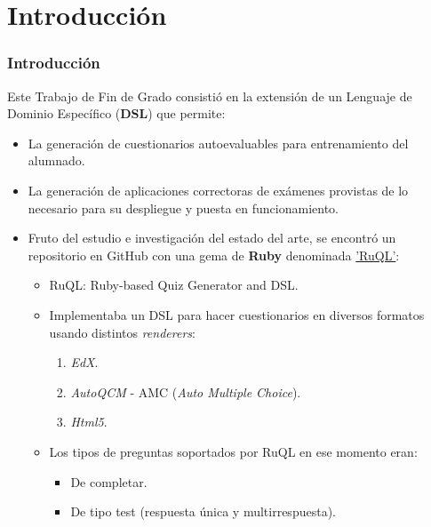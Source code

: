 \documentclass{beamer}
\begin{document}
\section{Introducción}
\begin{frame}
  \frametitle{Introducción}
  
  \begin{center}
    Este Trabajo de Fin de Grado consistió en la extensión de un Lenguaje de Dominio Específico ({\bfseries DSL}) que permite:
    \begin{itemize}
       \item La generación de cuestionarios autoevaluables para entrenamiento del alumnado.
       \item La generación de aplicaciones correctoras de exámenes provistas de lo necesario para su despliegue y puesta en funcionamiento.
    \end{itemize}
  \end{center}
  \framebreak
  
  \begin{itemize}
    \item Fruto del estudio e investigación del estado del arte, se encontró un repositorio en GitHub con una gema de {\bfseries Ruby} denominada 
    \href{http://github.com/saasbook/ruql}{'RuQL'}:
    \begin{itemize}
      \item RuQL: Ruby-based Quiz Generator and DSL.
      \item Implementaba un DSL para hacer cuestionarios en diversos formatos usando distintos \textit{renderers}:
      \begin{enumerate}
        \item \textit{EdX}.
        \item \textit{AutoQCM} - AMC (\textit{Auto Multiple Choice}).
        \item \textit{Html5}.
      \end{enumerate}
      \item Los tipos de preguntas soportados por RuQL en ese momento eran: 
      \begin{itemize}
        \item De completar.
        \item De tipo test (respuesta única y multirrespuesta).
      \end{itemize}
    \end{itemize}
  \end{itemize}
  \framebreak
  

\end{frame}
\end{document}
